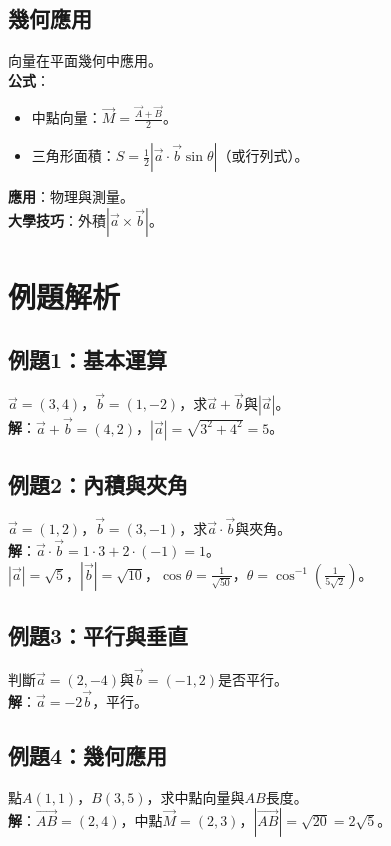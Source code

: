 \subsection{幾何應用}
向量在平面幾何中應用。\\
\textbf{公式}：
\begin{itemize}
    \item 中點向量：$\vec{M} = \frac{\vec{A} + \vec{B}}{2}$。
    \item 三角形面積：$S = \frac{1}{2} |\vec{a} \cdot \vec{b} \sin \theta|$（或行列式）。
\end{itemize}
\textbf{應用}：物理與測量。\\
\textbf{大學技巧}：外積$|\vec{a} \times \vec{b}|$。

\section{例題解析}

\subsection{例題1：基本運算}
$\vec{a} = (3, 4)$，$\vec{b} = (1, -2)$，求$\vec{a} + \vec{b}$與$|\vec{a}|$。\\
\textbf{解}：$\vec{a} + \vec{b} = (4, 2)$，$|\vec{a}| = \sqrt{3^2 + 4^2} = 5$。

\subsection{例題2：內積與夾角}
$\vec{a} = (1, 2)$，$\vec{b} = (3, -1)$，求$\vec{a} \cdot \vec{b}$與夾角。\\
\textbf{解}：$\vec{a} \cdot \vec{b} = 1 \cdot 3 + 2 \cdot (-1) = 1$。\\
$|\vec{a}| = \sqrt{5}$，$|\vec{b}| = \sqrt{10}$，$\cos \theta = \frac{1}{\sqrt{50}}$，$\theta = \cos^{-1}\left(\frac{1}{5\sqrt{2}}\right)$。

\subsection{例題3：平行與垂直}
判斷$\vec{a} = (2, -4)$與$\vec{b} = (-1, 2)$是否平行。\\
\textbf{解}：$\vec{a} = -2\vec{b}$，平行。

\subsection{例題4：幾何應用}
點$A(1, 1)$，$B(3, 5)$，求中點向量與$AB$長度。\\
\textbf{解}：$\vec{AB} = (2, 4)$，中點$\vec{M} = (2, 3)$，$|\vec{AB}| = \sqrt{20} = 2\sqrt{5}$。

